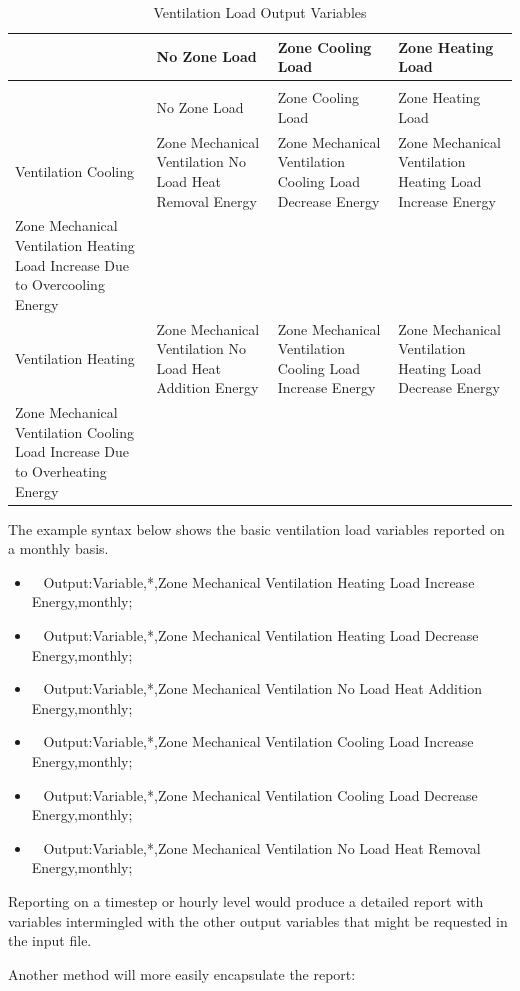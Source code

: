\begin{longtable}[c]{p{1.5in}p{1.5in}p{1.5in}p{1.5in}}
\caption{Ventilation Load Output Variables \label{table:ventilation-load-output-variables}} \tabularnewline
\toprule
 & No Zone Load & Zone Cooling Load & Zone Heating Load \tabularnewline
\midrule
\endfirsthead

\caption[]{Ventilation Load Output Variables} \tabularnewline
\toprule
 & No Zone Load & Zone Cooling Load & Zone Heating Load \tabularnewline
\midrule
\endhead

Ventilation Cooling & Zone Mechanical Ventilation No Load Heat Removal Energy & Zone Mechanical Ventilation Cooling Load Decrease Energy & Zone Mechanical Ventilation Heating Load Increase Energy \tabularnewline
Zone Mechanical Ventilation Heating Load Increase Due to Overcooling Energy \tabularnewline
Ventilation Heating & Zone Mechanical Ventilation No Load Heat Addition Energy & Zone Mechanical Ventilation Cooling Load Increase Energy & Zone Mechanical Ventilation Heating Load Decrease Energy \tabularnewline
Zone Mechanical Ventilation Cooling Load Increase Due to Overheating Energy \tabularnewline
\bottomrule
\end{longtable}

The example syntax below shows the basic ventilation load variables reported on a monthly basis.

\begin{itemize}
\item
  ~ Output:Variable,*,Zone Mechanical Ventilation Heating Load Increase Energy,monthly;
\item
  ~ Output:Variable,*,Zone Mechanical Ventilation Heating Load Decrease Energy,monthly;
\item
  ~ Output:Variable,*,Zone Mechanical Ventilation No Load Heat Addition Energy,monthly;
\item
  ~ Output:Variable,*,Zone Mechanical Ventilation Cooling Load Increase Energy,monthly;
\item
  ~ Output:Variable,*,Zone Mechanical Ventilation Cooling Load Decrease Energy,monthly;
\item
  ~ Output:Variable,*,Zone Mechanical Ventilation No Load Heat Removal Energy,monthly;
\end{itemize}

Reporting on a timestep or hourly level would produce a detailed report with variables intermingled with the other output variables that might be requested in the input file.

Another method will more easily encapsulate the report:

